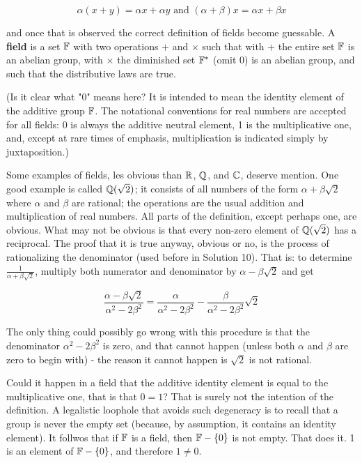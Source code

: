 \begin{equation}
    \alpha(x+y) = \alpha x + \alpha y \text{ and } (\alpha + \beta) x = \alpha x + \beta x
\end{equation}

and once that is observed the correct definition of fields become guessable. A \textbf{field} is a set $\mathbb{F}$ with two operations $+$ and $\times$ such that with $+$ the entire set $\mathbb{F}$ is an abelian group, with $\times$ the diminished set $\mathbb{F}^\ast$ (omit 0) is an abelian group, and such that the distributive laws are true.

(Is it clear what "0" means here? It is intended to mean the identity element of the additive group $\mathbb{F}$. The notational conventions for real numbers are accepted for all fields: 0 is always the additive neutral element, 1 is the multiplicative one, and, except at rare times of emphasis, multiplication is indicated simply by juxtaposition.)

Some examples of fields, les obvious than $\mathbb{R}$, $\mathbb{Q}$, and $\mathbb{C}$, deserve mention. One good example is called $\mathbb{Q}(\sqrt{2})$; it consists of all numbers of the form $\alpha + \beta \sqrt{2}$ where $\alpha$ and $\beta$ are rational; the operations are the usual addition and multiplication of real numbers. All parts of the definition, except perhaps one, are obvious. What may not be obvious is that every non-zero element of $\mathbb{Q}(\sqrt{2})$ has a reciprocal. The proof that it is true anyway, obvious or no, is the process of rationalizing the denominator (used before in Solution 10). That is: to determine $\frac{1}{\alpha + \beta \sqrt{2}}$, multiply both numerator and denominator by $\alpha - \beta \sqrt{2}$ and get

\begin{equation}
    \frac{\alpha-\beta \sqrt{2}}{\alpha^2 - 2\beta^2} = \frac{\alpha}{\alpha^2 - 2\beta^2} - \frac{\beta}{\alpha^2 - 2\beta^2}\sqrt{2}
\end{equation}

The only thing could possibly go wrong with this procedure is that the denominator $\alpha^2 - 2\beta^2$ is zero, and that cannot happen (unless both $\alpha$ and $\beta$ are zero to begin with) - the reason it cannot happen is $\sqrt{2}$ is not rational.

Could it happen in a field that the additive identity element is equal to the multiplicative one, that is that $0 = 1$? That is surely not the intention of the definition. A legalistic loophole that avoids such degeneracy is to recall that a group is never the empty set (because, by assumption, it contains an identity element). It follwos that if $\mathbb{F}$ is a field, then $\mathbb{F} - \{0\}$ is not empty. That does it. 1 is an element of $\mathbb{F} - \{0\}$, and therefore $1 \neq 0$.

